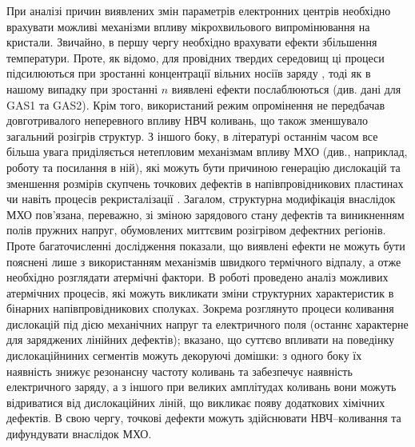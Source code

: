\documentclass[a4paper,14pt,oneside,openany]{memoir}
\begin{document}
При аналізі причин виявлених змін параметрів електронних центрів необхідно врахувати можливі механізми впливу
мікрохвильового випромінювання на кристали.
Звичайно, в першу чергу необхідно врахувати ефекти збільшення температури.
Проте, як відомо, для провідних твердих середовищ ці процеси підсилюються при зростанні концентрації вільних носіїв заряду \cite{MW:Rev}, тоді як в нашому випадку при зростанні $n$ виявлені ефекти послаблюються (див. дані для GAS1 та GAS2).
Крім того, використаний режим опромінення не передбачав довготривалого неперевного впливу НВЧ коливань, що також зменшувало загальний розігрів структур.
З іншого боку, в літературі останнім часом все більша увага приділяється нетепловим механізмам впливу МХО (див., наприклад, роботу \cite{MW:Si2018} та посилання в ній), які можуть бути причиною генерацію дислокацій та зменшення розмірів скупчень точкових дефектів в напівпровідникових пластинах \cite{Konakova2007JTF} чи навіть процесів рекристалізації \cite{MW:Si2018}.
Загалом, структурна модифікація внаслідок МХО пов'язана, переважно,
зі зміною зарядового стану дефектів та виникненням полів пружних напруг, обумовлених миттєвим розігрівом дефектних регіонів.
Проте багаточисленні дослідження показали, що виявлені ефекти не можуть бути пояснені лише з використанням механізмів швидкого термічного відпалу, а отже необхідно розглядати атермічні фактори.
В роботі \cite{Konakova2007JTF} проведено аналіз можливих атермічних процесів, які можуть викликати зміни структурних характеристик в бінарних напівпровідникових сполуках.
Зокрема розглянуто процеси коливання дислокацій під дією механічних напруг та електричного поля (останнє характерне для заряджених лінійних дефектів);
вказано, що суттєво впливати на поведінку дислокаційниних сегментів можуть декоруючі домішки:
з одного боку їх наявність знижує резонансну частоту коливань та забезпечує наявність електричного заряду,
а з іншого при великих амплітудах коливань вони можуть відриватися від дислокаційних ліній, що викликає появу додаткових хімічних дефектів.
В свою чергу, точкові дефекти можуть здійснювати НВЧ--коливання та дифундувати внаслідок МХО.
\end{document}
